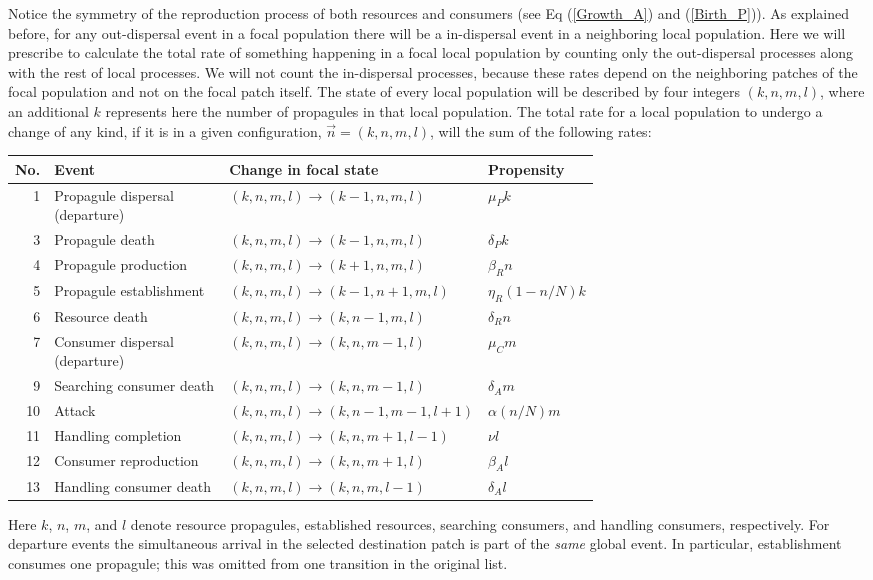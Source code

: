 Notice the symmetry of the reproduction process of both resources and consumers (see Eq (\ref{Growth_A}) and (\ref{Birth_P})). As explained before, for any out-dispersal event in a focal population there will be a in-dispersal event in a neighboring local population. Here we will prescribe to calculate the total rate of something happening in a focal local population by counting only the out-dispersal processes along with the rest of local processes. We will not count the in-dispersal processes, because these rates depend on the neighboring patches of the focal population and not on the focal patch itself. The state of every local population will be described by four integers $(k,n,m,l)$, where an additional $k$ represents here the number of propagules in that local population. The total rate for a local population to undergo a change of any kind, if it is in a given configuration, $\vec{n}=(k,n,m,l)$, will the sum of the following rates:
\begin{center}
\small
\renewcommand{\arraystretch}{1.18}
\begin{tabular}{@{}r p{0.33\linewidth} p{0.35\linewidth} l@{}}
\hline
No. & Event & Change in focal state & Propensity \\
\hline
1 & Propagule dispersal (departure) & $(k,n,m,l)\to(k-1,n,m,l)$ & $\mu_P k$ \\
3 & Propagule death & $(k,n,m,l)\to(k-1,n,m,l)$ & $\delta_P k$ \\
4 & Propagule production & $(k,n,m,l)\to(k+1,n,m,l)$ & $\beta_R n$ \\
5 & Propagule establishment & $(k,n,m,l)\to(k-1,n+1,m,l)$ & $\eta_R (1-n/N)k$ \\
6 & Resource death & $(k,n,m,l)\to(k,n-1,m,l)$ & $\delta_R n$ \\
7 & Consumer dispersal (departure) & $(k,n,m,l)\to(k,n,m-1,l)$ & $\mu_C m$ \\
9 & Searching consumer death & $(k,n,m,l)\to(k,n,m-1,l)$ & $\delta_A m$ \\
10 & Attack & $(k,n,m,l)\to(k,n-1,m-1,l+1)$ & $\alpha(n/N)m$ \\
11 & Handling completion & $(k,n,m,l)\to(k,n,m+1,l-1)$ & $\nu l$ \\
12 & Consumer reproduction & $(k,n,m,l)\to(k,n,m+1,l)$ & $\beta_A l$ \\
13 & Handling consumer death & $(k,n,m,l)\to(k,n,m,l-1)$ & $\delta_A l$ \\
\hline
\end{tabular}
\end{center}
\noindent Here $k$, $n$, $m$, and $l$ denote resource propagules, established resources, searching consumers, and handling consumers, respectively. For departure events the simultaneous arrival in the selected destination patch is part of the \emph{same} global event. In particular, establishment consumes one propagule; this was omitted from one transition in the original list.
  
